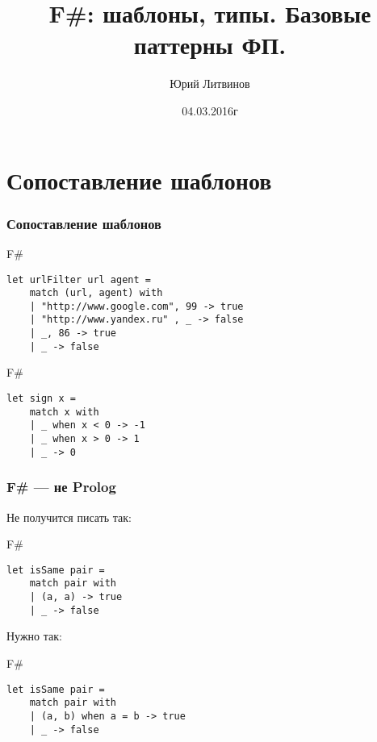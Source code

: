 \documentclass[xetex,mathserif,serif]{beamer}
\title{F\#: шаблоны, типы. Базовые паттерны ФП.}
\author{Юрий Литвинов}
\date{04.03.2016г}
\begin{document}
	
	\frame{\titlepage}
	
	\section{Сопоставление шаблонов}
	
	\begin{frame}[fragile]
		\frametitle{Сопоставление шаблонов}
\begin{exampleblock}{F\#}
\begin{lstlisting}
let urlFilter url agent =
    match (url, agent) with
    | "http://www.google.com", 99 -> true
    | "http://www.yandex.ru" , _ -> false
    | _, 86 -> true
    | _ -> false
\end{lstlisting}
\end{exampleblock}

\begin{exampleblock}{F\#}
\begin{lstlisting}
let sign x =
    match x with
    | _ when x < 0 -> -1
    | _ when x > 0 -> 1
    | _ -> 0
\end{lstlisting}
\end{exampleblock}
\end{frame}

	\begin{frame}[fragile]
		\frametitle{F\# --- не Prolog}
		Не получится писать так:
\begin{exampleblock}{F\#}
\begin{lstlisting}
let isSame pair =
    match pair with
    | (a, a) -> true
    | _ -> false
\end{lstlisting}
\end{exampleblock}
Нужно так:		
\begin{exampleblock}{F\#}
\begin{lstlisting}
let isSame pair =
    match pair with
    | (a, b) when a = b -> true
    | _ -> false
\end{lstlisting}
\end{exampleblock}
\end{frame}
\end{document}
